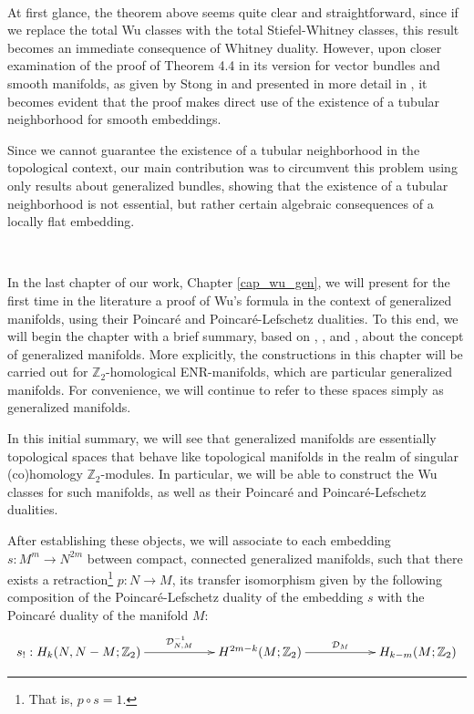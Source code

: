 \documentclass[12pt,oneside]{book}
\newcommand{\Z}{\mathbb{Z}}
\begin{document}
    \
    
    At first glance, the theorem above seems quite clear and straightforward, since if we replace the 
    total Wu classes with the total Stiefel-Whitney classes, this result becomes an immediate consequence 
    of Whitney duality. However, upon closer examination of the proof of Theorem 4.4 in its version for 
    vector bundles and smooth manifolds, as given by Stong in \cite{stong} and presented in more detail 
    in \cite{joao}, it becomes evident that the proof makes direct use of the existence of a tubular 
    neighborhood for smooth embeddings.

    Since we cannot guarantee the existence of a tubular neighborhood in the topological context, our 
    main contribution was to circumvent this problem using only results about generalized bundles, 
    showing that the existence of a tubular neighborhood is not essential, but rather certain algebraic 
    consequences of a locally flat embedding.

    \
    
    In the last chapter of our work, Chapter \ref{cap_wu_gen}, we will present for the first time in the 
    literature a proof of Wu's formula in the context of generalized manifolds, using their Poincaré and 
    Poincaré-Lefschetz dualities. To this end, we will begin the chapter with a brief summary, based 
    on \cite{biasi}, \cite{denise}, and \cite{bredon_2}, about the concept of generalized manifolds. 
    More explicitly, the constructions in this chapter will be carried out for $\Z_{2}$-homological 
    ENR-manifolds, which are particular generalized manifolds. For convenience, we will continue to 
    refer to these spaces simply as generalized manifolds.

    In this initial summary, we will see that generalized manifolds are essentially topological spaces 
    that behave like topological manifolds in the realm of singular (co)homology $\Z_{2}$-modules. In 
    particular, we will be able to construct the Wu classes for such manifolds, as well as their Poincaré 
    and Poincaré-Lefschetz dualities.

    After establishing these objects, we will associate to each embedding $s:M^{m}\to N^{2m}$ between 
    compact, connected generalized manifolds, such that there exists a retraction\footnote{That is, 
    $p\circ s=1$.} $p:N\to M$, its transfer isomorphism given by the following composition of the 
    Poincaré-Lefschetz duality of the embedding $s$ with the Poincaré duality of the manifold $M$:
    $$ \xymatrix @C=0.5cm {
    s_{!}:H_{k}(N,N-M;\Z_{2}) \ar[rrr]^-{\mathcal{D}^{-1}_{N,M}} &&& H^{2m-k}(M;\Z_{2}) \ar[rrr]^-{\mathcal{D}_{M}} &&& H_{k-m}(M;\Z_{2})
    } $$
\end{document}
